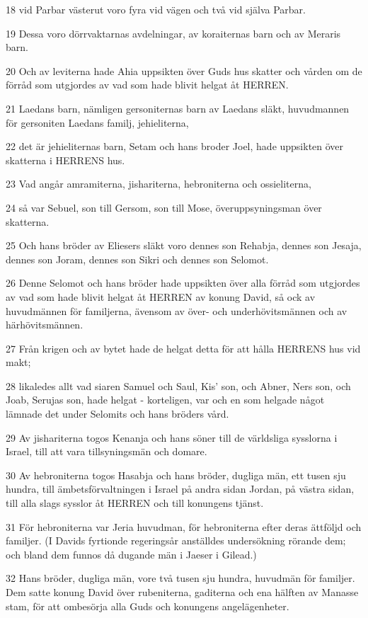 \par 18 vid Parbar västerut voro fyra vid vägen och två vid själva Parbar.
\par 19 Dessa voro dörrvaktarnas avdelningar, av koraiternas barn och av Meraris barn.
\par 20 Och av leviterna hade Ahia uppsikten över Guds hus skatter och vården om de förråd som utgjordes av vad som hade blivit helgat åt HERREN.
\par 21 Laedans barn, nämligen gersoniternas barn av Laedans släkt, huvudmannen för gersoniten Laedans familj, jehieliterna,
\par 22 det är jehieliternas barn, Setam och hans broder Joel, hade uppsikten över skatterna i HERRENS hus.
\par 23 Vad angår amramiterna, jishariterna, hebroniterna och ossieliterna,
\par 24 så var Sebuel, son till Gersom, son till Mose, överuppsyningsman över skatterna.
\par 25 Och hans bröder av Eliesers släkt voro dennes son Rehabja, dennes son Jesaja, dennes son Joram, dennes son Sikri och dennes son Selomot.
\par 26 Denne Selomot och hans bröder hade uppsikten över alla förråd som utgjordes av vad som hade blivit helgat åt HERREN av konung David, så ock av huvudmännen för familjerna, ävensom av över- och underhövitsmännen och av härhövitsmännen.
\par 27 Från krigen och av bytet hade de helgat detta för att hålla HERRENS hus vid makt;
\par 28 likaledes allt vad siaren Samuel och Saul, Kis' son, och Abner, Ners son, och Joab, Serujas son, hade helgat - korteligen, var och en som helgade något lämnade det under Selomits och hans bröders vård.
\par 29 Av jishariterna togos Kenanja och hans söner till de världsliga sysslorna i Israel, till att vara tillsyningsmän och domare.
\par 30 Av hebroniterna togos Hasabja och hans bröder, dugliga män, ett tusen sju hundra, till ämbetsförvaltningen i Israel på andra sidan Jordan, på västra sidan, till alla slags sysslor åt HERREN och till konungens tjänst.
\par 31 För hebroniterna var Jeria huvudman, för hebroniterna efter deras ättföljd och familjer. (I Davids fyrtionde regeringsår anställdes undersökning rörande dem; och bland dem funnos då dugande män i Jaeser i Gilead.)
\par 32 Hans bröder, dugliga män, vore två tusen sju hundra, huvudmän för familjer. Dem satte konung David över rubeniterna, gaditerna och ena hälften av Manasse stam, för att ombesörja alla Guds och konungens angelägenheter.

